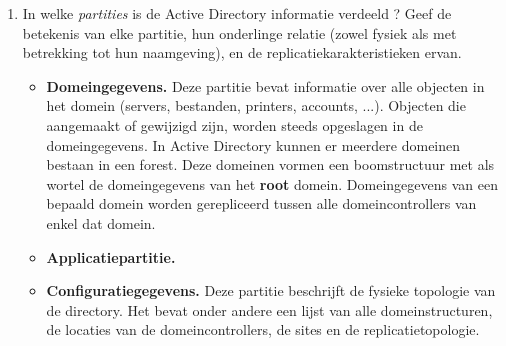 \documentclass{report}
\newcommand{\vraag}[2]{
	\item #1
	
	#2
}
\begin{document}
\begin{enumerate}
		\vraag { In welke \textit{partities} is de Active Directory informatie verdeeld ? Geef de betekenis van elke partitie, hun onderlinge relatie (zowel fysiek als met betrekking tot hun naamgeving), en de replicatiekarakteristieken ervan. \accentuate{(laatste helft \textsection 2.2.3)} } {
			\begin{itemize}
				\item \textbf{Domeingegevens.} Deze partitie bevat informatie over alle objecten in het domein (servers, bestanden, printers, accounts, ...). Objecten die aangemaakt of gewijzigd zijn, worden steeds opgeslagen in de domeingegevens. In Active Directory kunnen er meerdere domeinen bestaan in een forest. Deze domeinen vormen een boomstructuur met als wortel de domeingegevens van het \textbf{root} domein. Domeingegevens van een bepaald domein worden gerepliceerd tussen alle domeincontrollers van enkel dat domein.
				\item \textbf{Applicatiepartitie.}
				\item \textbf{Configuratiegegevens.} Deze partitie beschrijft de fysieke topologie van de directory. Het bevat onder andere een lijst van alle domeinstructuren, de locaties van de domeincontrollers, de sites en de replicatietopologie.
			\end{itemize}
		}
	\end{enumerate}
\end{document}
